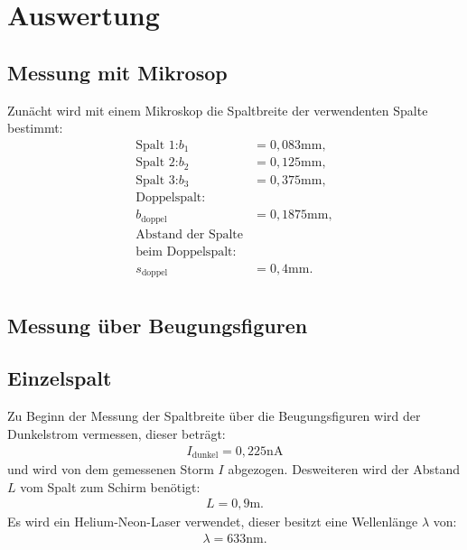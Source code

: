 \section{Auswertung}
\label{sec:Auswertung}
\subsection{Messung mit Mikrosop}
Zunächt wird mit einem Mikroskop die Spaltbreite der verwendenten
Spalte bestimmt:
\begin{align*}
  \text{Spalt 1:}  b_1&= 0,083\si{\milli\meter},\\
  \text{Spalt 2:}  b_2&= 0,125\si{\milli\meter},\\
  \text{Spalt 3:}  b_3&= 0,375\si{\milli\meter},\\
\text{Doppelspalt:} \\
b_\mathrm{doppel}&=0,1875\si{\milli\meter},\\
\text{Abstand der Spalte}\\
\text{beim Doppelspalt:}\\
 s_\mathrm{doppel}&=0,4\si{\milli\meter}.\\
\end{align*}
\subsection{Messung über Beugungsfiguren}
\subsection{Einzelspalt}
\label{sec:einzel}

Zu Beginn der Messung der Spaltbreite über die Beugungsfiguren wird der Dunkelstrom vermessen, dieser beträgt:
\begin{align*}
  I_\mathrm{dunkel}= 0,225\si{\nano\ampere}
\end{align*}
und wird von dem gemessenen Storm $I$ abgezogen.
Desweiteren wird der Abstand $L$ vom Spalt zum Schirm benötigt:
\begin{align*}
  L=0,9\si{\meter}.
\end{align*}
Es wird ein Helium-Neon-Laser verwendet, dieser besitzt eine Wellenlänge $\lambda$ von:
\begin{align*}
  \lambda=633\si{\nano\meter}.
\end{align*}


